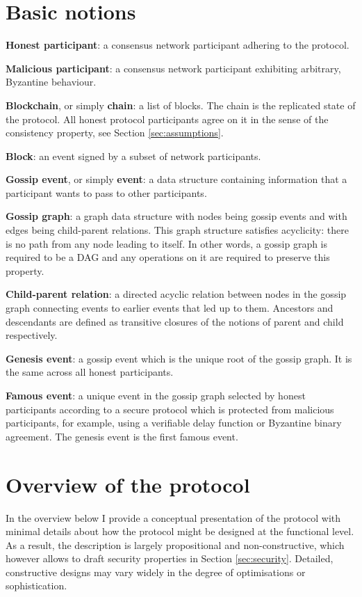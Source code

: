 \documentclass[a4paper,11pt]{article}
\begin{document}
\section{Basic notions}

\textbf{Honest participant}: a consensus network participant adhering to the protocol.

\noindent
\textbf{Malicious participant}: a consensus network participant exhibiting arbitrary, Byzantine
behaviour.

\noindent
\textbf{Blockchain}, or simply \textbf{chain}: a list of blocks. The chain is the replicated state
of the protocol. All honest protocol participants agree on it in the sense of the consistency
property, see Section \ref{sec:assumptions}.

\noindent
\textbf{Block}: an event signed by a subset of network participants.

\noindent
\textbf{Gossip event}, or simply \textbf{event}: a data structure containing information that a
participant wants to pass to other participants.

\noindent
\textbf{Gossip graph}: a graph data structure with nodes being gossip events and with edges being
child-parent relations. This graph structure satisfies acyclicity: there is no path from any node
leading to itself. In other words, a gossip graph is required to be a DAG and any operations on it
are required to preserve this property.

\noindent
\textbf{Child-parent relation}: a directed acyclic relation between nodes in the gossip graph
connecting events to earlier events that led up to them. Ancestors and descendants are defined as
transitive closures of the notions of parent and child respectively.

\noindent
\textbf{Genesis event}: a gossip event which is the unique root of the gossip graph. It is the same
across all honest participants.

\noindent
\textbf{Famous event}: a unique event in the gossip graph selected by honest participants according
to a secure protocol which is protected from malicious participants, for example, using a verifiable
delay function or Byzantine binary agreement. The genesis event is the first famous event.


\section{Overview of the protocol}

In the overview below I provide a conceptual presentation of the protocol with minimal details about
how the protocol might be designed at the functional level. As a result, the description is largely
propositional and non-constructive, which however allows to draft security properties in Section
\ref{sec:security}. Detailed, constructive designs may vary widely in the degree of optimisations or
sophistication.
\end{document}

